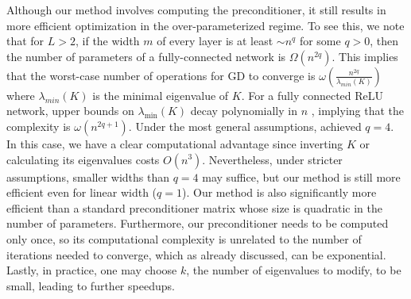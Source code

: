 \documentclass[10pt]{article} %
\theoremstyle{plain}
\theoremstyle{definition}
\theoremstyle{remark}
\begin{document}
Although our method involves computing the preconditioner, it still results in more efficient optimization in the over-parameterized regime. To see this, we note that for $L>2$, if the width $m$ of every layer is at least $\sim n^q$ for some $q>0$, then the number of parameters of a fully-connected network is $\Omega(n^{2q})$. This implies that the worst-case number of operations for GD to converge is $\omega\left(\frac{n^{2q}}{\lambda_{min}(K)}\right)$ where ${\lambda_{min}(K)}$ is the minimal eigenvalue of $K$. For a fully connected ReLU network, upper bounds on $\lambda_{\min}(K)$ decay polynomially in $n$ \citep{barzilai2023generalization}, implying that the complexity is $\omega(n^{2q+1})$. Under the most general assumptions, \citet{song2019quadratic} achieved $q=4$. In this case, we have a clear computational advantage since inverting $K$ or calculating its eigenvalues costs $O(n^3)$. Nevertheless, under stricter assumptions, smaller widths than $q=4$ may suffice, but our method is still more efficient even for linear width ($q=1$).
Our method is also significantly more efficient than a standard preconditioner matrix whose size is quadratic in the number of parameters.
Furthermore, our preconditioner needs to be computed only once, so its computational complexity is unrelated to the number of iterations needed to converge, which as already discussed, can be exponential. Lastly, in practice, one may choose $k$, the number of eigenvalues to modify, to be small, leading to further speedups.

\end{document}
